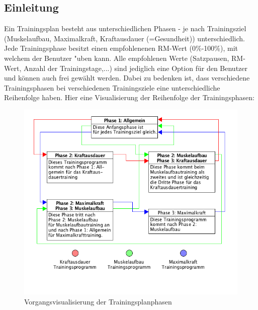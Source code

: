 \documentclass[FIPLY_base.tex]{subfiles}
\begin{document}
	\subsection{Einleitung}
	Ein Trainingsplan besteht aus unterschiedlichen Phasen - je nach Trainingsziel (Muskelaufbau, Maximalkraft, Kraftausdauer (=Gesundheit)) unterschiedlich. Jede Trainingsphase besitzt einen empfohlenenen RM-Wert (0\%-100\%), mit welchem der Benutzer "uben kann. Alle empfohlenen Werte (Satzpausen, RM-Wert, Anzahl der Trainingstage,...) sind jediglich eine Option für den Benutzer und können auch frei gewählt werden.
	Dabei zu bedenken ist, dass verschiedene Trainingsphasen bei verschiedenen Trainingsziele eine unterschiedliche Reihenfolge haben.
	Hier eine Visualisierung der Reihenfolge der Trainingsphasen:
	\begin{figure}[H]
		\centering
		\includegraphics[scale=0.6]{img/VisualisierungTrainingsplan}
		\caption{Vorgangsvisualisierung der Trainingsplanphasen}
	\end{figure}
	
\end{document}
